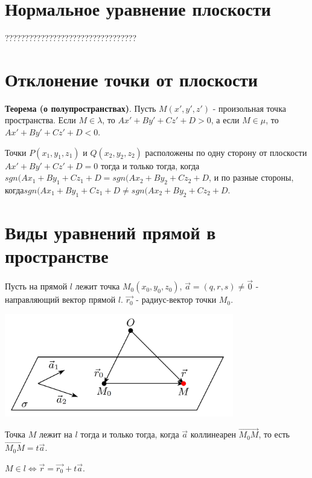 \documentclass[a4paper]{article}
\begin{document}
\section*{Нормальное уравнение плоскости}

?????????????????????????????????

\section*{Отклонение точки от плоскости}

\textbf{Теорема (о полупространствах)}. Пусть $M(x', y', z')$ - произольная точка пространства. Если $M \in \lambda$, то $Ax' + By' + Cz' + D > 0$, а если $M \in \mu$, то $Ax' + By' + Cz' + D < 0$.

Точки $P(x_1, y_1, z_1)$ и $Q(x_2, y_2, z_2)$ расположены по одну сторону от плоскости\newline $Ax' + By' + Cz' + D = 0$ тогда и только тогда, когда\newline $sgn(Ax_1 + By_1 +Cz_1+D = sgn(Ax_2 + By_2 + Cz_2 + D$, и по разные стороны, когда\newline $sgn(Ax_1 + By_1 +Cz_1+D \neq sgn(Ax_2 + By_2 + Cz_2 + D$.

\section*{Виды уравнений прямой в пространстве}

Пусть на прямой $l$ лежит точка $M_0(x_0,y_0,z_0)$, $\vec{a} = (q,r,s) \neq \vec{0}$ - направляющий вектор прямой $l$. $\vec{r_0}$ - радиус-вектор точки $M_0$.

\includegraphics[width=10cm]{t8}

Точка $M$ лежит на $l$ тогда и только тогда, когда $\vec{a}$ коллинеарен $\overrightarrow{M_0M}$, то есть $\overrightarrow{M_0M}  = t\vec{a}$.

$M \in l \Leftrightarrow \vec{r} = \vec{r_0} + t\vec{a}$.
\end{document}
